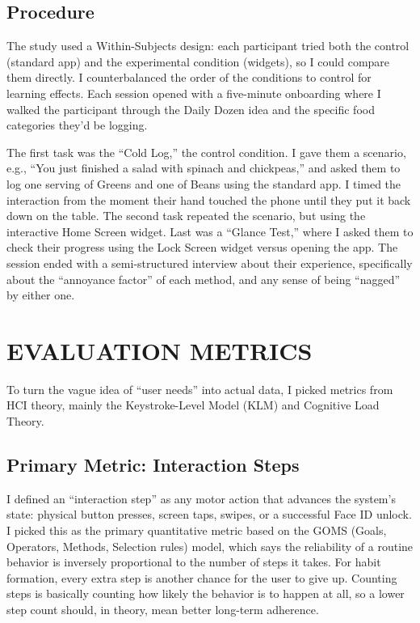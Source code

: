\documentclass[10pt,twocolumn]{article}
\begin{document}
\subsection{Procedure}

The study used a Within-Subjects design: each participant tried both the control (standard app) and the experimental condition (widgets), so I could compare them directly. I counterbalanced the order of the conditions to control for learning effects. Each session opened with a five-minute onboarding where I walked the participant through the Daily Dozen idea and the specific food categories they'd be logging.

The first task was the ``Cold Log,'' the control condition. I gave them a scenario, e.g., ``You just finished a salad with spinach and chickpeas,'' and asked them to log one serving of Greens and one of Beans using the standard app. I timed the interaction from the moment their hand touched the phone until they put it back down on the table. The second task repeated the scenario, but using the interactive Home Screen widget. Last was a ``Glance Test,'' where I asked them to check their progress using the Lock Screen widget versus opening the app. The session ended with a semi-structured interview about their experience, specifically about the ``annoyance factor'' of each method, and any sense of being ``nagged'' by either one.

\section{EVALUATION METRICS}

To turn the vague idea of ``user needs'' into actual data, I picked metrics from HCI theory, mainly the Keystroke-Level Model (KLM) and Cognitive Load Theory.\cite{CardKeystrokeModel}

\subsection{Primary Metric: Interaction Steps}

I defined an ``interaction step'' as any motor action that advances the system's state: physical button presses, screen taps, swipes, or a successful Face ID unlock. I picked this as the primary quantitative metric based on the GOMS (Goals, Operators, Methods, Selection rules) model, which says the reliability of a routine behavior is inversely proportional to the number of steps it takes. For habit formation, every extra step is another chance for the user to give up. Counting steps is basically counting how likely the behavior is to happen at all, so a lower step count should, in theory, mean better long-term adherence.
\end{document}
